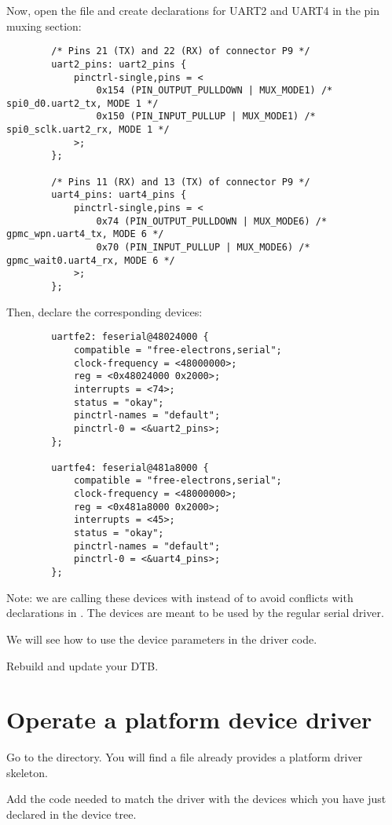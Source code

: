Now, open the 
file and create declarations for UART2 and UART4 in the pin muxing
section:

\begin{verbatim}
		/* Pins 21 (TX) and 22 (RX) of connector P9 */
		uart2_pins: uart2_pins {
			pinctrl-single,pins = <
				0x154 (PIN_OUTPUT_PULLDOWN | MUX_MODE1) /* spi0_d0.uart2_tx, MODE 1 */
				0x150 (PIN_INPUT_PULLUP | MUX_MODE1) /* spi0_sclk.uart2_rx, MODE 1 */
			>;
		};

		/* Pins 11 (RX) and 13 (TX) of connector P9 */
		uart4_pins: uart4_pins {
			pinctrl-single,pins = <
				0x74 (PIN_OUTPUT_PULLDOWN | MUX_MODE6) /* gpmc_wpn.uart4_tx, MODE 6 */
				0x70 (PIN_INPUT_PULLUP | MUX_MODE6) /* gpmc_wait0.uart4_rx, MODE 6 */
			>;
		};
\end{verbatim}

Then, declare the corresponding devices:

\begin{verbatim}
		uartfe2: feserial@48024000 {
			compatible = "free-electrons,serial";
			clock-frequency = <48000000>;
			reg = <0x48024000 0x2000>;
			interrupts = <74>;
			status = "okay";
			pinctrl-names = "default";
			pinctrl-0 = <&uart2_pins>;
		};

		uartfe4: feserial@481a8000 {
			compatible = "free-electrons,serial";
			clock-frequency = <48000000>;
			reg = <0x481a8000 0x2000>;
			interrupts = <45>;
			status = "okay";
			pinctrl-names = "default";
			pinctrl-0 = <&uart4_pins>;
		};

\end{verbatim}

Note: we are calling these devices with  instead of
 to avoid conflicts with declarations in
. The  devices are 
meant to be used by the regular serial driver.

We will see how to use the device parameters in the driver code.

Rebuild and update your DTB.

\section{Operate a platform device driver}

Go to the  directory.
You will find a  file already provides a platform
driver skeleton.

Add the code needed to match the driver with the devices which you have
just declared in the device tree.

